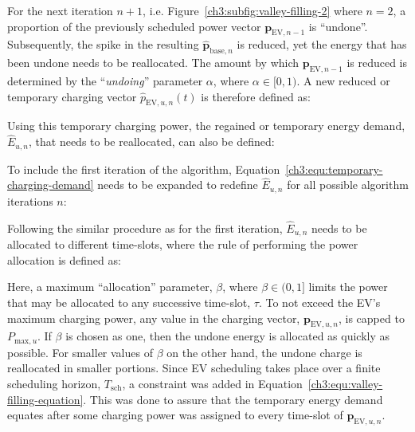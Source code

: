For the next iteration $n+1$, i.e. Figure~\ref{ch3:subfig:valley-filling-2} where $n=2$, a proportion of the previously scheduled power vector $\textbf{p}_{\text{EV},n-1}$ is ``undone''.
Subsequently, the spike in the resulting $\hat{\textbf{p}}_{\text{base}, n}$ is reduced, yet the energy that has been undone needs to be reallocated.
The amount by which $\textbf{p}_{\text{EV},n-1}$ is reduced is determined by the ``\textit{undoing}'' parameter $\alpha$, where $\alpha \in [0, 1)$.
A new reduced or temporary charging vector $\hat{p}_{\text{EV}, u, n}(t)$ is therefore defined as:



Using this temporary charging power, the regained or temporary energy demand, $\hat{E}_{u,n}$, that needs to be reallocated, can also be defined:



To include the first iteration of the algorithm, Equation~\ref{ch3:equ:temporary-charging-demand} needs to be expanded to redefine $\hat{E}_{u,n}$ for all possible algorithm iterations $n$:



Following the similar procedure as for the first iteration, $\hat{E}_{u,n}$ needs to be allocated to different time-slots, where the rule of performing the power allocation is defined as:



\nomenclature[K]{$\beta$}{Allocation parameter to assign a portion of the temporary energy demand, $\hat{E}_{u,n}$, where $\beta \in (0, 1]$ (Chapter~\ref{ch3})}

Here, a maximum ``allocation'' parameter, $\beta$, where $\beta \in (0, 1]$ limits the power that may be allocated to any successive time-slot, $\tau$.
To not exceed the EV's maximum charging power, any value in the charging vector, $\textbf{p}_{\text{EV},u,n}$, is capped to $P_{\text{max},u}$.
If $\beta$ is chosen as one, then the undone energy is allocated as quickly as possible.
For smaller values of $\beta$ on the other hand, the undone charge is reallocated in smaller portions.
Since EV scheduling takes place over a finite scheduling horizon, $T_\text{sch}$, a constraint was added in Equation~\ref{ch3:equ:valley-filling-equation}.
This was done to assure that the temporary energy demand equates after some charging power was assigned to every time-slot of $\textbf{p}_{\text{EV},u,n}$.

